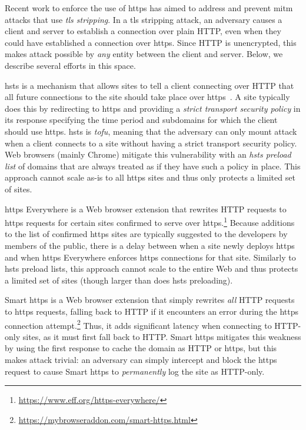 Recent work to enforce the use of \ac{https} has aimed to address and prevent
\ac{mitm} attacks that use \emph{\ac{tls} stripping}. In a \ac{tls} stripping
attack, an adversary causes a client and server to establish a connection over
plain HTTP, even when they could have established a connection over \ac{https}.
Since HTTP is unencrypted, this makes  attack possible by \emph{any}
entity between the client and server. Below, we describe several efforts in this
space.

\ac{hsts} is a mechanism that allows sites to tell a client connecting over HTTP
that all future connections to the site should take place over
\ac{https}~\cite{rfc6797}. A site typically does this by redirecting to
\ac{https} and providing a \emph{strict transport security policy} in its
response specifying the time period and subdomains for which the client should
use \ac{https}. \ac{hsts} is \emph{\ac{tofu}}, meaning that the adversary can
only mount  attack when a client connects to a site without having a
strict transport security policy. Web browsers (mainly Chrome) mitigate this
vulnerability with an \emph{\ac{hsts} preload list} of domains that are always
treated as if they have such a policy in place. This approach cannot scale as-is
to all \ac{https} sites and thus only protects a limited set of sites.

\ac{https} Everywhere is a Web browser extension that rewrites HTTP requests to
\ac{https} requests for certain sites confirmed to serve over
\ac{https}.\footnote{\url{https://www.eff.org/https-everywhere/}} Because
additions to the list of confirmed \ac{https} sites are typically suggested to
the developers by members of the public, there is a delay between when a site
newly deploys \ac{https} and when \ac{https} Everywhere enforces \ac{https}
connections for that site. Similarly to \ac{hsts} preload lists, this approach
cannot scale to the entire Web and thus protects a limited set of sites (though
larger than does \ac{hsts} preloading).

Smart \ac{https} is a Web browser extension that simply rewrites \emph{all} HTTP
requests to \ac{https} requests, falling back to HTTP if it encounters an error
during the \ac{https} connection
attempt.\footnote{\url{https://mybrowseraddon.com/smart-https.html}} Thus, it
adds significant latency when connecting to HTTP-only sites, as it must first
fall back to HTTP. Smart \ac{https} mitigates this weakness by using the first
response to cache the domain as HTTP or \ac{https}, but this makes 
attack trivial: an adversary can simply intercept and block the \ac{https}
request to cause Smart \ac{https} to \emph{permanently} log the site as
HTTP-only.

